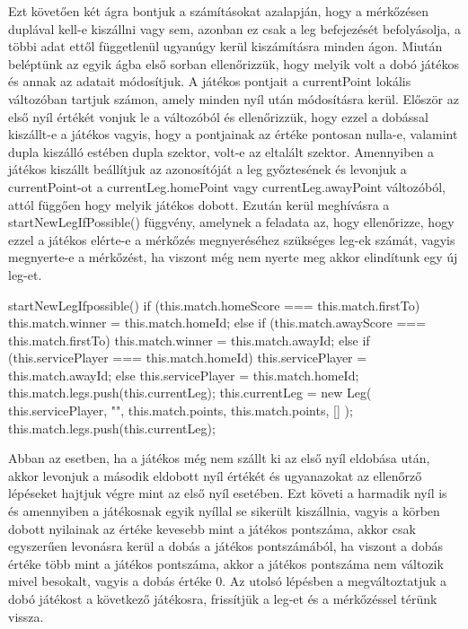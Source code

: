 Ezt követően két ágra bontjuk a számításokat azalapján, hogy a mérkőzésen duplával kell-e kiszállni vagy sem, azonban ez csak a leg befejezését befolyásolja, a többi adat ettől függetlenül ugyanúgy kerül kiszámításra minden ágon. Miután beléptünk az egyik ágba első sorban ellenőrizzük, hogy melyik volt a dobó játékos és annak az adatait módosítjuk. A játékos pontjait a currentPoint lokális változóban tartjuk számon, amely minden nyíl után módosításra kerül. Először az első nyíl értékét vonjuk le a változóból és ellenőrizzük, hogy ezzel a dobással kiszállt-e a játékos vagyis, hogy a pontjainak az értéke pontosan nulla-e, valamint dupla kiszálló estében dupla szektor, volt-e az eltalált szektor. Amennyiben a játékos kiszállt beállítjuk az azonosítóját a leg győztesének és levonjuk a currentPoint-ot a currentLeg.homePoint vagy currentLeg.awayPoint változóból, attól függően hogy melyik játékos dobott. Ezután kerül meghívásra a startNewLegIfPossible() függvény, amelynek a feladata az, hogy ellenőrizze, hogy ezzel a játékos elérte-e a mérkőzés megnyeréséhez szükséges leg-ek számát, vagyis megnyerte-e a mérkőzést, ha viszont még nem nyerte meg akkor elindítunk egy új leg-et.

\begin{cpp}
  startNewLegIfpossible() {
    if (this.match.homeScore === this.match.firstTo) {
      this.match.winner = this.match.homeId;
    } else if (this.match.awayScore === this.match.firstTo) {
      this.match.winner = this.match.awayId;
    } else {
      if (this.servicePlayer === this.match.homeId) {
        this.servicePlayer = this.match.awayId;
      } else {
        this.servicePlayer = this.match.homeId;
      }
      this.match.legs.push(this.currentLeg);
      this.currentLeg = new Leg(
        this.servicePlayer,
        "",
        this.match.points,
        this.match.points,
        []
      );
      this.match.legs.push(this.currentLeg);
    }
  }
\end{cpp}

Abban az esetben, ha a játékos még nem szállt ki az első nyíl eldobása után, akkor levonjuk a második eldobott nyíl értékét és ugyanazokat az ellenőrző lépéseket hajtjuk végre mint az első nyíl esetében. Ezt követi a harmadik nyíl is és amennyiben a játékosnak egyik nyíllal se sikerült kiszállnia, vagyis a körben dobott nyilainak az értéke kevesebb mint a játékos pontszáma, akkor csak egyszerűen levonásra kerül a dobás a játékos pontszámából, ha viszont a dobás értéke több mint a játékos pontszáma, akkor a játékos pontszáma nem változik mivel besokalt, vagyis a dobás értéke 0. Az utolsó lépésben a megváltoztatjuk a dobó játékost a következő játékosra, frissítjük a leg-et és a mérkőzéssel térünk vissza.

